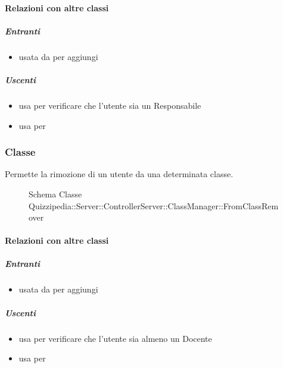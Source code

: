 \paragraph{Relazioni con altre classi}
\subparagraph{Entranti}
\begin{itemize}
\item usata da  per aggiungi
\end{itemize}
\subparagraph{Uscenti}
\begin{itemize}
\item usa  per verificare che l'utente sia un Responsabile
\item usa  per 
\end{itemize}
\subsubsection{Classe }
Permette la rimozione di un utente da una determinata classe.
\begin{figure}[H]
\centering
\noindent{}
\caption[Schema Classe FromClassRemover]{Schema Classe Quizzipedia::Server::ControllerServer::ClassManager::FromClassRemover}
\end{figure}
\paragraph{Relazioni con altre classi}
\subparagraph{Entranti}
\begin{itemize}
\item usata da  per aggiungi
\end{itemize}
\subparagraph{Uscenti}
\begin{itemize}
\item usa  per verificare che l'utente sia almeno un Docente
\item usa  per 
\end{itemize}
